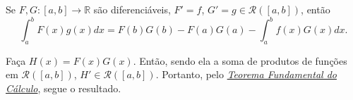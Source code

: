 \documentclass[../analysis_notes.tex]{subfiles}
\begin{document}
\hypertarget{integration_by_parts}{
	\begin{theorem*}
		Se \(F, G:[a, b]\rightarrow \mathbb{R}\) são diferenciáveis, \(F'=f\), \(G'=g\in \mathcal{R}([a, b])\), então
		\[
			\int_{a}^{b}F(x)g(x)dx=F(b)G(b)-F(a)G(a)-\int_{a}^{b}f(x)G(x)dx.
		\]
	\end{theorem*}
}
\begin{proof*}
	Faça \(H(x)=F(x)G(x)\). Então, sendo ela a soma de produtos de funções em \(\mathcal{R}([a, b])\), \(H'\in \mathcal{R}([a, b])\). Portanto, pelo \hyperlink{fundamental_theorem_of_calculus}{\textit{Teorema Fundamental do Cálculo}}, segue o resultado. \qedsymbol
\end{proof*}
\end{document}
